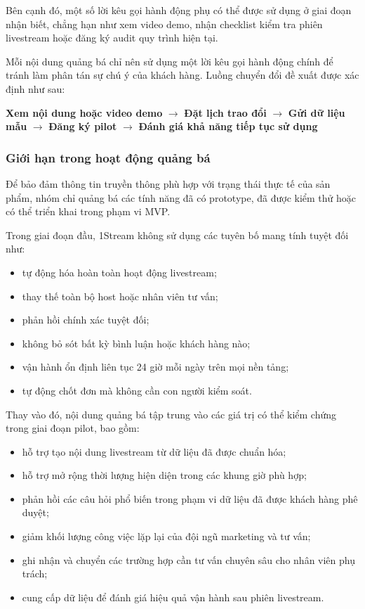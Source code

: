 Bên cạnh đó, một số lời kêu gọi hành động phụ có thể được sử dụng ở giai đoạn nhận biết, chẳng hạn như xem video demo, nhận checklist kiểm tra phiên livestream hoặc đăng ký audit quy trình hiện tại.

Mỗi nội dung quảng bá chỉ nên sử dụng một lời kêu gọi hành động chính để tránh làm phân tán sự chú ý của khách hàng. Luồng chuyển đổi đề xuất được xác định như sau:

\begin{center}
\textbf{Xem nội dung hoặc video demo}
$\rightarrow$
\textbf{Đặt lịch trao đổi}
$\rightarrow$
\textbf{Gửi dữ liệu mẫu}
$\rightarrow$
\textbf{Đăng ký pilot}
$\rightarrow$
\textbf{Đánh giá khả năng tiếp tục sử dụng}
\end{center}

\subsubsection{Giới hạn trong hoạt động quảng bá}

Để bảo đảm thông tin truyền thông phù hợp với trạng thái thực tế của sản phẩm, nhóm chỉ quảng bá các tính năng đã có prototype, đã được kiểm thử hoặc có thể triển khai trong phạm vi MVP.

Trong giai đoạn đầu, 1Stream không sử dụng các tuyên bố mang tính tuyệt đối như:

\begin{itemize}
    \item tự động hóa hoàn toàn hoạt động livestream;
    \item thay thế toàn bộ host hoặc nhân viên tư vấn;
    \item phản hồi chính xác tuyệt đối;
    \item không bỏ sót bất kỳ bình luận hoặc khách hàng nào;
    \item vận hành ổn định liên tục 24 giờ mỗi ngày trên mọi nền tảng;
    \item tự động chốt đơn mà không cần con người kiểm soát.
\end{itemize}

Thay vào đó, nội dung quảng bá tập trung vào các giá trị có thể kiểm chứng trong giai đoạn pilot, bao gồm:

\begin{itemize}
    \item hỗ trợ tạo nội dung livestream từ dữ liệu đã được chuẩn hóa;
    \item hỗ trợ mở rộng thời lượng hiện diện trong các khung giờ phù hợp;
    \item phản hồi các câu hỏi phổ biến trong phạm vi dữ liệu đã được khách hàng phê duyệt;
    \item giảm khối lượng công việc lặp lại của đội ngũ marketing và tư vấn;
    \item ghi nhận và chuyển các trường hợp cần tư vấn chuyên sâu cho nhân viên phụ trách;
    \item cung cấp dữ liệu để đánh giá hiệu quả vận hành sau phiên livestream.
\end{itemize}

